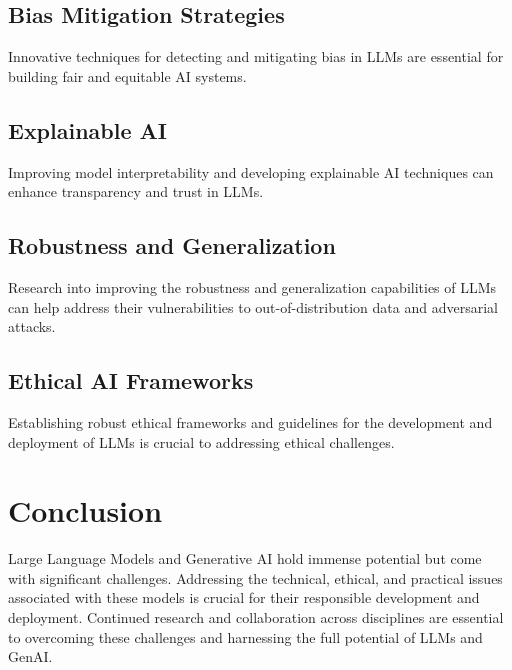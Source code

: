 \subsection{Bias Mitigation Strategies}
Innovative techniques for detecting and mitigating bias in LLMs are essential for building fair and equitable AI systems.

\subsection{Explainable AI}
Improving model interpretability and developing explainable AI techniques can enhance transparency and trust in LLMs.

\subsection{Robustness and Generalization}
Research into improving the robustness and generalization capabilities of LLMs can help address their vulnerabilities to out-of-distribution data and adversarial attacks.

\subsection{Ethical AI Frameworks}
Establishing robust ethical frameworks and guidelines for the development and deployment of LLMs is crucial to addressing ethical challenges.

\section{Conclusion}
Large Language Models and Generative AI hold immense potential but come with significant challenges. Addressing the technical, ethical, and practical issues associated with these models is crucial for their responsible development and deployment. Continued research and collaboration across disciplines are essential to overcoming these challenges and harnessing the full potential of LLMs and GenAI.


